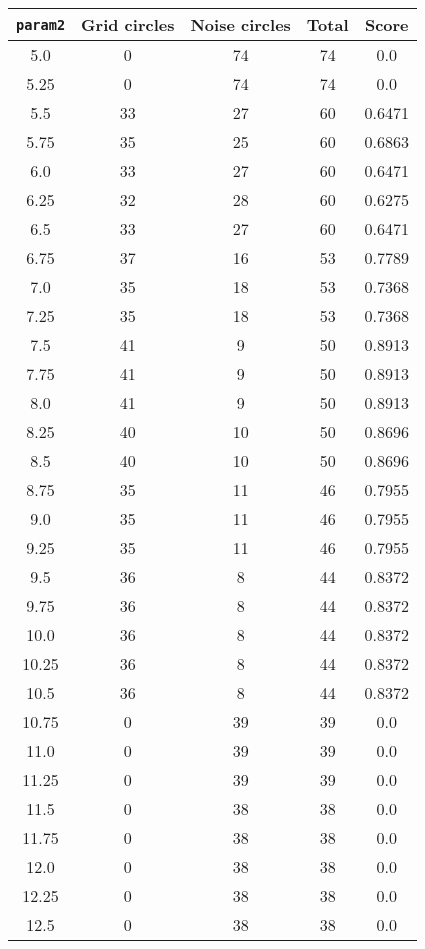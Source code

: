 \documentclass[letterpaper, 12pt]{article}
\begin{document}
\begin{longtable}{|c|c|c|c|c|}
\hline
\textbf{\texttt{param2}} & \textbf{Grid circles} & \textbf{Noise circles} & \textbf{Total} & \textbf{Score} \\
\hline
5.0 & 0 & 74 & 74 & 0.0 \\
\hline
5.25 & 0 & 74 & 74 & 0.0 \\
\hline
5.5 & 33 & 27 & 60 & 0.6471 \\
\hline
5.75 & 35 & 25 & 60 & 0.6863 \\
\hline
6.0 & 33 & 27 & 60 & 0.6471 \\
\hline
6.25 & 32 & 28 & 60 & 0.6275 \\
\hline
6.5 & 33 & 27 & 60 & 0.6471 \\
\hline
6.75 & 37 & 16 & 53 & 0.7789 \\
\hline
7.0 & 35 & 18 & 53 & 0.7368 \\
\hline
7.25 & 35 & 18 & 53 & 0.7368 \\
\hline
7.5 & 41 & 9 & 50 & 0.8913 \\
\hline
7.75 & 41 & 9 & 50 & 0.8913 \\
\hline
8.0 & 41 & 9 & 50 & 0.8913 \\
\hline
8.25 & 40 & 10 & 50 & 0.8696 \\
\hline
8.5 & 40 & 10 & 50 & 0.8696 \\
\hline
8.75 & 35 & 11 & 46 & 0.7955 \\
\hline
9.0 & 35 & 11 & 46 & 0.7955 \\
\hline
9.25 & 35 & 11 & 46 & 0.7955 \\
\hline
9.5 & 36 & 8 & 44 & 0.8372 \\
\hline
9.75 & 36 & 8 & 44 & 0.8372 \\
\hline
10.0 & 36 & 8 & 44 & 0.8372 \\
\hline
10.25 & 36 & 8 & 44 & 0.8372 \\
\hline
10.5 & 36 & 8 & 44 & 0.8372 \\
\hline
10.75 & 0 & 39 & 39 & 0.0 \\
\hline
11.0 & 0 & 39 & 39 & 0.0 \\
\hline
11.25 & 0 & 39 & 39 & 0.0 \\
\hline
11.5 & 0 & 38 & 38 & 0.0 \\
\hline
11.75 & 0 & 38 & 38 & 0.0 \\
\hline
12.0 & 0 & 38 & 38 & 0.0 \\
\hline
12.25 & 0 & 38 & 38 & 0.0 \\
\hline
12.5 & 0 & 38 & 38 & 0.0 \\

\end{longtable}
\end{document}
